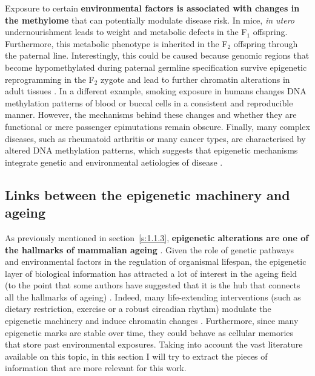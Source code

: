 \bigskip

Exposure to certain \textbf{environmental factors is associated with changes in the methylome} that can potentially modulate disease risk. In mice, \textit{in utero} undernourishment leads to weight and metabolic defects in the F$_1$ offspring. Furthermore, this metabolic phenotype is inherited in the F$_2$ offspring through the paternal line. Interestingly, this could be caused because genomic regions that become hypomethylated during paternal germline specification survive epigenetic reprogramming in the F$_2$ zygote and lead to further chromatin alterations in adult tissues \citep{Radford2014}. In a different example, smoking exposure in humans changes DNA methylation patterns of blood \citep{Roby2016} or buccal cells \citep{Teschendorff2015} in a consistent and reproducible manner. However, the mechanisms behind these changes and whether they are functional or mere passenger epimutations remain obscure. Finally, many complex diseases, such as rheumatoid arthritis or many cancer types, are characterised by altered DNA methylation patterns, which suggests that epigenetic mechanisms integrate genetic and environmental aetiologies of disease \citep{Liu2013,Widschwendter2018}.

\smallskip

\subsection{Links between the epigenetic machinery and ageing} \label{s:1.2.3}

\smallskip

As previously mentioned in section~\ref{s:1.1.3}, \textbf{epigenetic alterations are one of the hallmarks of mammalian ageing} \citep{Lopez-Otin2013}. Given the role of genetic pathways and environmental factors in the regulation of organismal lifespan, the epigenetic layer of biological information has attracted a lot of interest in the ageing field (to the point that some authors have suggested that it is the hub that connects all the hallmarks of ageing) \citep{Booth2016}. Indeed, many life-extending interventions (such as dietary restriction, exercise or a robust circadian rhythm) modulate the epigenetic machinery and induce chromatin changes \citep{Benayoun2015a}. Furthermore, since many epigenetic marks are stable over time, they could behave as cellular memories that store past environmental exposures. Taking into account the vast literature available on this topic, in this section I will try to extract the pieces of information that are more relevant for this work.

